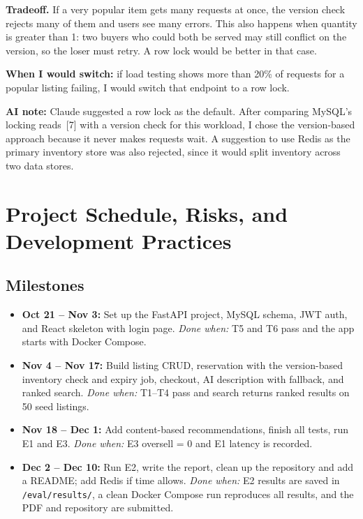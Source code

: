 \documentclass[11pt]{article}
\begin{document}
\textbf{Tradeoff.} If a very popular item gets many requests at once, the version check rejects many
of them and users see many errors. This also happens when quantity is greater than 1: two buyers
who could both be served may still conflict on the version, so the loser must retry. A row lock would
be better in that case.

\textbf{When I would switch:} if load testing shows more than 20\% of requests for a popular listing
failing, I would switch that endpoint to a row lock.

\textbf{AI note:} Claude suggested a row lock as the default. After comparing MySQL's locking
reads~[7] with a version check for this workload, I chose the version-based approach because it
never makes requests wait. A suggestion to use Redis as the primary inventory store was also
rejected, since it would split inventory across two data stores.

\section{Project Schedule, Risks, and Development Practices}
\subsection*{Milestones}
\begin{itemize}
  \item \textbf{Oct 21 -- Nov 3:} Set up the FastAPI project, MySQL schema, JWT auth, and React
  skeleton with login page. \emph{Done when:} T5 and T6 pass and the app starts with Docker Compose.
  \item \textbf{Nov 4 -- Nov 17:} Build listing CRUD, reservation with the version-based inventory
  check and expiry job, checkout, AI description with fallback, and ranked search.
  \emph{Done when:} T1--T4 pass and search returns ranked results on 50 seed listings.
  \item \textbf{Nov 18 -- Dec 1:} Add content-based recommendations, finish all tests, run E1 and E3.
  \emph{Done when:} E3 oversell = 0 and E1 latency is recorded.
  \item \textbf{Dec 2 -- Dec 10:} Run E2, write the report, clean up the repository and add a README;
  add Redis if time allows. \emph{Done when:} E2 results are saved in \texttt{/eval/results/}, a clean
  Docker Compose run reproduces all results, and the PDF and repository are submitted.
\end{itemize}
\end{document}
